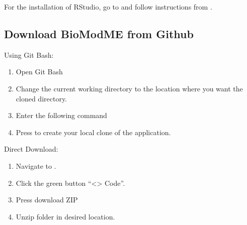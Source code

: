 \documentclass[letterpaper,10pt,english]{sphinxmanual}
\let\sphinxpxdimen\pdfpxdimen\else\newdimen\sphinxpxdimen
\begin{document}
\sphinxAtStartPar
For the installation of RStudio, go to and follow
instructions from .


\subsection{Download BioModME from Github}
\label{\detokenize{pages/gettingStarted/downloadtoR:download-biomodme-from-github}}
\sphinxAtStartPar
{} \sphinxhyphen{} Using Git Bash:
\begin{enumerate}
%
\item {} 
\sphinxAtStartPar
Open Git Bash

\item {} 
\sphinxAtStartPar
Change the current working directory to the location where you want the
cloned directory.

\item {} 
\sphinxAtStartPar
Enter the following command
\begin{quote}

\begin{sphinxVerbatim}[commandchars=\\\{\}]
  
\end{sphinxVerbatim}
\end{quote}

\item {} 
\sphinxAtStartPar
Press  to create your local clone of the application.

\end{enumerate}

\sphinxAtStartPar
{} \sphinxhyphen{} Direct Download:
\begin{enumerate}
%
\item {} 
\sphinxAtStartPar
Navigate to .

\item {} 
\sphinxAtStartPar
Click the green button “<> Code”.

\noindent{}

\item {} 
\sphinxAtStartPar
Press download ZIP

\noindent{\hspace*{\fill}\sphinxincludegraphics[width=336\sphinxpxdimen,height=347\sphinxpxdimen]{{zip_download}.png}\hspace*{\fill}}

\item {} 
\sphinxAtStartPar
Unzip folder in desired location.

\end{enumerate}
\end{document}
